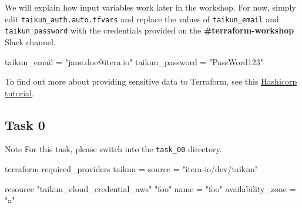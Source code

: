 We will explain how input variables work later in the workshop.
For now, simply edit \texttt{taikun\_auth.auto.tfvars}
and replace the values of \texttt{taikun\_email} and \texttt{taikun\_password}
with the credentials provided on the \textbf{\#terraform-workshop} Slack channel.
\begin{tf}
taikun_email = "jane.doe@itera.io"
taikun_password = "PassWord123"
\end{tf}
To find out more about providing sensitive data to Terraform, see this \href{https://learn.hashicorp.com/tutorials/terraform/sensitive-variables}{Hashicorp tutorial}.

\subsection{Task 0}
\begin{note}{Note}
For this task, please switch into the \texttt{task\_00} directory.
\end{note}

\blindtext{}

\begin{tf}
terraform {
  required_providers {
    taikun = {
      source = "itera-io/dev/taikun"
    }
  }
}

resource "taikun_cloud_credential_aws" "foo" {
  name = "foo"
  availability_zone = "a"
}
\end{tf}

\blindtext{}
